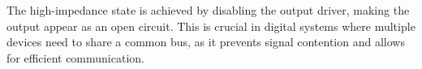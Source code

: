 The high-impedance state is achieved by disabling the output driver, making the output appear as an open circuit. This is crucial in digital systems where multiple devices need to share a common bus, as it prevents signal contention and allows for efficient communication.

